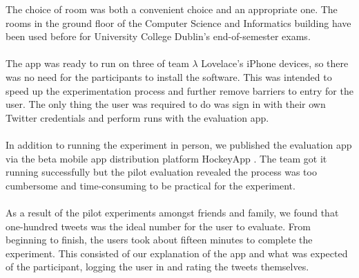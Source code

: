 \documentclass{article}
\begin{document}
The choice of room was both a convenient choice and an appropriate one. The rooms in the ground floor of the Computer Science and Informatics building have been used before for University College Dublin's end-of-semester exams. 
\\\\
The app was ready to run on three of team $\lambda$ Lovelace's iPhone devices, so there was no need for the participants to install the software. This was intended to speed up the experimentation process and further remove barriers to entry for the user. The only thing the user was required to do was sign in with their own Twitter credentials and perform runs with the evaluation app.
\\\\
In addition to running the experiment in person, we published the evaluation app via the beta mobile app distribution platform HockeyApp \cite{hockeyapp}. The team got it running successfully but the pilot evaluation revealed the process was too cumbersome and time-consuming to be practical for the experiment.
\\\\
As a result of the pilot experiments amongst friends and family, we found that one-hundred tweets was the ideal number for the user to evaluate. From beginning to finish, the users took about fifteen minutes to complete the experiment. This consisted of our explanation of the app and what was expected of the participant, logging the user in and rating the tweets themselves. 
\end{document}
